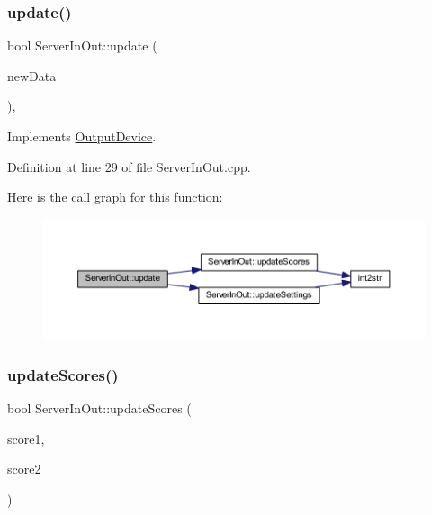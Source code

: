 \subsubsection{\texorpdfstring{update()}{update()}}
{\footnotesize\ttfamily bool Server\+In\+Out\+::update (\begin{DoxyParamCaption}\item[{\hyperlink{struct_scoreboard_data}{Scoreboard\+Data}}]{new\+Data }\end{DoxyParamCaption})\hspace{0.3cm}{\ttfamily [override]}, {\ttfamily [virtual]}}



Implements \hyperlink{class_output_device_a9a5f6cf0655bd1c63639b593b10dbced}{Output\+Device}.



Definition at line 29 of file Server\+In\+Out.\+cpp.

Here is the call graph for this function\+:
\nopagebreak
\begin{figure}[H]
\begin{center}
\leavevmode
\includegraphics[width=350pt]{class_server_in_out_a5442d5353fbf8445b7df75ee23c3322a_cgraph}
\end{center}
\end{figure}
\mbox{\label{class_server_in_out_aaa8e027abfe326208f48890b7e225672}} 
\subsubsection{\texorpdfstring{update\+Scores()}{updateScores()}}
{\footnotesize\ttfamily bool Server\+In\+Out\+::update\+Scores (\begin{DoxyParamCaption}\item[{int}]{score1,  }\item[{int}]{score2 }\end{DoxyParamCaption})\hspace{0.3cm}{\ttfamily [private]}}




